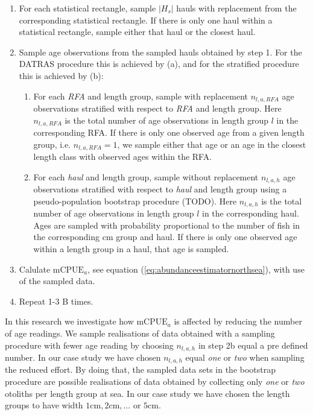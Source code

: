 \documentclass[a4paper 12pt]{article}
\numberwithin{equation}{section}
\begin{document}
\begin{enumerate}
\item For each statistical rectangle, sample $|H_s|$ hauls with replacement from the corresponding statistical rectangle. If there is only one haul within a statistical rectangle, sample either that haul or the closest haul.
\item Sample age observations from the sampled hauls obtained by step 1. For the DATRAS procedure this is achieved by (a), and for the stratified procedure this is achieved by (b):
\begin{enumerate}
\item For each \textit{RFA} and length group, sample with replacement $n_{l,a,RFA}$ age observations stratified with respect to \textit{RFA} and length group. Here $n_{l,a,RFA}$ is the total number of age observations in length group $l$ in the corresponding RFA. If there is only one observed age from a given length group, i.e. $n_{l,a,RFA} = 1$, we sample either that age or an age in the closest length class with observed ages within the RFA.
\item For each \textit{haul} and length group, sample without replacement  $n_{l,a,h}$ age observations stratified with respect to \textit{haul} and length group using a pseudo-population bootstrap procedure \citep{mashreghi2016survey} (TODO). Here $n_{l,a,h}$ is the total number of age observations in length group $l$ in the corresponding haul. Ages are sampled with probability  proportional to the number of fish in the corresponding cm group and haul. If there is only one observed age within a length group in a haul, that age is sampled.
\end{enumerate}
\item Calulate $\text{mCPUE}_a$, see equation (\ref{eq:abundanceestimatornorthsea}), with use of the sampled data.
\item Repeat 1-3 B times.
\end{enumerate}

In this research we investigate how $\text{mCPUE}_a$ is affected by reducing the number of age readings. We sample realisations of data obtained with a sampling procedure with fewer age reading by choosing $n_{l,a,h}$ in step 2b equal a pre defined number. In our case study we have chosen $n_{l,a,h}$ equal \textit{one} or \textit{two} when sampling the reduced effort. By doing that, the sampled data sets in the bootstrap procedure are possible realisations of data obtained by collecting only \textit{one} or \textit{two} otoliths per length group at sea. In our case study we have chosen the length groups to have width $1\text{cm},2\text{cm},...\text{ or }5\text{cm}$.
\end{document}
